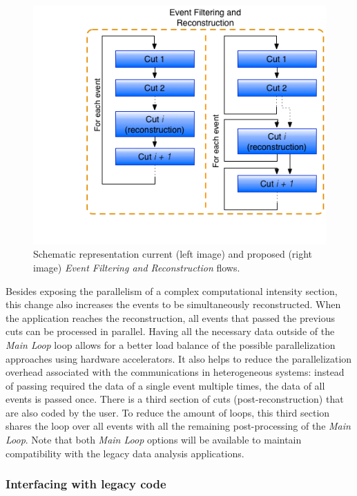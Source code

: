 \begin{figure}[!htp]
	\begin{center}
		\includegraphics[scale=0.5]{imgs/new_docuts.png}
		\caption{Schematic representation current (left image) and proposed (right image) \textit{Event Filtering and Reconstruction} flows.}
		\label{fig:new_docuts}
	\end{center}
\end{figure}


Besides exposing the parallelism of a complex computational intensity section, this change also increases the events to be simultaneously reconstructed. When the application reaches the reconstruction, all events that passed the previous cuts can be processed in parallel. Having all the necessary data outside of the \textit{Main Loop} loop allows for a better load balance of the possible parallelization approaches using hardware accelerators. It also helps to reduce the parallelization overhead associated with the communications in heterogeneous systems: instead of passing required the data of a single event multiple times, the data of all events is passed once. There is a third section of cuts (post-reconstruction) that are also coded by the user. To reduce the amount of loops, this third section shares the loop over all events with all the remaining post-processing of the \textit{Main Loop}. Note that both \textit{Main Loop} options will be available to maintain compatibility with the legacy data analysis applications.

\subsubsection*{Interfacing with legacy code}

